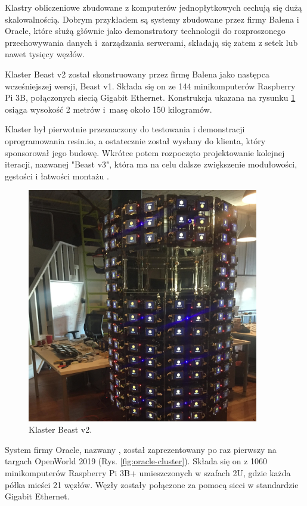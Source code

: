 Klastry obliczeniowe zbudowane z komputerów jednopłytkowych cechują się dużą skalowalnością.
Dobrym przykładem są systemy zbudowane przez firmy Balena i Oracle, które służą głównie jako
demonstratory technologii do rozproszonego przechowywania danych i~zarządzania serwerami,
składają się zatem z setek lub nawet tysięcy węzłów.

Klaster Beast v2 został skonstruowany przez firmę Balena jako następca wcześniejszej wersji,
Beast v1. Składa się on ze 144 minikomputerów Raspberry Pi 3B, połączonych siecią Gigabit
Ethernet. Konstrukcja ukazana na rysunku \ref{fig:balena-cluster} osiąga wysokość 2 metrów
i~masę około 150 kilogramów.

Klaster był pierwotnie przeznaczony do testowania i demonstracji oprogramowania resin.io,
a ostatecznie został wysłany do klienta, który sponsorował jego budowę. Wkrótce potem
rozpoczęto projektowanie kolejnej iteracji, nazwanej "Beast v3", która ma na celu dalsze
zwiększenie modułowości, gęstości i łatwości montażu \cite{balena-cluster}.

\begin{figure}[h]
      \centering
      \includegraphics[width=0.9\textwidth]{graf/Balena.jpg}
      \caption {
            Klaster Beast v2. \cite{balena-cluster}
      }
      \label{fig:balena-cluster}
\end{figure}

System firmy Oracle, nazwany , został zaprezentowany po raz
pierwszy na targach OpenWorld 2019 (Rys. \ref{fig:oracle-cluster}). Składa się on z 1060
minikomputerów Raspberry Pi 3B+ umieszczonych w szafach 2U, gdzie każda półka mieści 21 węzłów.
Węzły zostały połączone za pomocą sieci w standardzie Gigabit Ethernet.

